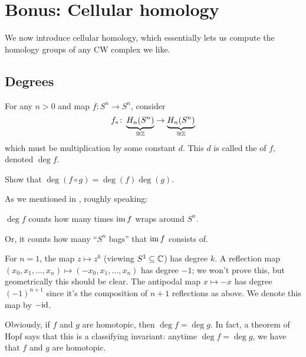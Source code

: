 \chapter{Bonus: Cellular homology}
We now introduce cellular homology, which essentially lets us compute
the homology groups of any CW complex we like.

\section{Degrees}
\label{sec:homology_degrees}
For any $n > 0$ and map $f \colon S^n \to S^n$, consider
\[ f_\ast \colon \underbrace{H_n(S^n)}_{\cong \mathbb Z} \to \underbrace{H_n(S^n)}_{\cong \mathbb Z} \]
which must be multiplication by some constant $d$.
This $d$ is called the  of $f$, denoted $\deg f$.
\begin{ques}
	Show that $\deg(f \circ g) = \deg(f) \deg(g)$.
\end{ques}

As we mentioned in , roughly speaking:
\begin{moral}
	$\deg f$ counts how many times $\operatorname{im} f$ wraps around $S^n$.
\end{moral}
Or, it counts how many ``$S^n$ bags'' that $\operatorname{im} f$ consists of.

\begin{example}
	[Degree]
	\listhack
	\begin{enumerate}[(a)]
		\ii For $n=1$, the map $z \mapsto z^k$ (viewing $S^1 \subseteq \mathbb C$)
		has degree $k$.
		\ii A reflection map $(x_0, x_1, \dots, x_n) \mapsto (-x_0, x_1, \dots, x_n)$
		has degree $-1$; we won't prove this, but geometrically this should be clear.
		\ii The antipodal map $x \mapsto -x$ has degree $(-1)^{n+1}$
		since it's the composition of $n+1$ reflections as above.
		We denote this map by $-\mathrm{id}$.
	\end{enumerate}
\end{example}

Obviously, if $f$ and $g$ are homotopic, then $\deg f = \deg g$.
In fact, a theorem of Hopf says that this is a classifying invariant:
anytime $\deg f = \deg g$, we have that $f$ and $g$ are homotopic.

